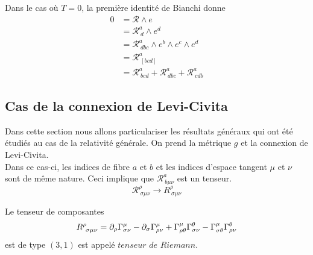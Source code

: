 \documentclass[a4paper,11pt]{report}
\begin{document}
                Dans le cas où $T = 0$, la première identité de Bianchi donne
                \begin{align}
                    0 &= \mathscr{R}\wedge e\\
                    &= \mathscr{R}^a_{~d}\wedge e^d\\
                    &= \mathscr{R}^a_{~dbc}\wedge e^b\wedge e^c\wedge e^d \\
                    &= \mathscr{R}^a_{~[bcd]}\\
                    &= \mathscr{R}^a_{~bcd}+\mathscr{R}^a_{~dbc}+\mathscr{R}^a_{~cdb}\label{eq:idbianchi}
                \end{align}
                
            \subsection{Cas de la connexion de Levi-Civita}
                        
                Dans cette section nous allons particulariser les résultats généraux qui ont été étudiés au cas de la relativité générale. On prend la métrique $g$ et la connexion de Levi-Civita. \\
                
                Dans ce cas-ci, les indices de fibre $a$ et $b$ et les indices d'espace tangent $\mu$ et $\nu$ sont de même nature. Ceci implique que $\mathscr{R}^a_{~b\mu\nu}$ est un tenseur.
                \begin{equation*}
                    \mathscr{R}^\rho_{~\sigma\mu\nu}\to R^\rho_{~\sigma\mu\nu}
                \end{equation*}
                
                \begin{definition}
                    Le tenseur de composantes 
                    \begin{equation}
                        R^\rho_{~\sigma\mu\nu} = \partial_\rho\Gamma^\mu_{\sigma \nu}-\partial_\sigma\Gamma^\mu_{\rho\nu} + \Gamma^\mu_{\rho \theta}\Gamma^\theta_{\sigma\nu}-\Gamma^\mu_{\sigma \theta}\Gamma^\theta_{\rho\nu}
                    \end{equation}
                    est de type $(3,1)$ est appelé $\textit{tenseur de Riemann}$.
                \end{definition}
                
\end{document}
